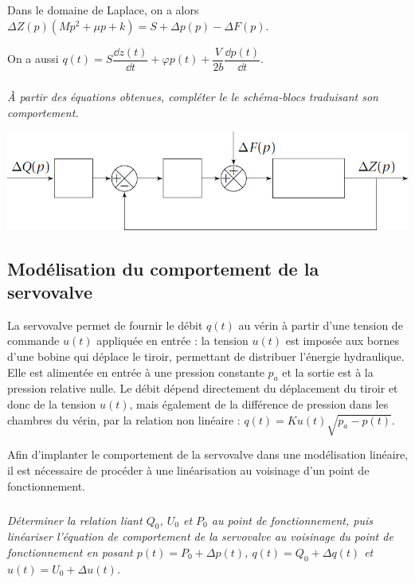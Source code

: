 \documentclass[10pt,fleqn]{article} %
\begin{document}
\begin{multicols}{2}
\begin{corrige}
Dans le domaine de Laplace, on a alors $ \Delta Z(p)  \left( Mp^2 + \mu p +k\right) = S+\Delta p(p) - \Delta F(p )
$.



On a aussi $q(t)=S \dfrac{\dd z (t)}{\dd t} +\varphi p(t) + \dfrac{V}{2b}  \dfrac{\dd p(t)}{\dd t}$. 
\end{corrige}
\else
\fi

\subparagraph{}\textit{À partir des équations obtenues, compléter le le schéma-blocs traduisant son
comportement.}
\ifprof
\begin{corrige}
\end{corrige}
\else
\fi

\begin{center}
\includegraphics[width=\linewidth]{images/fig_03}
\end{center}



\subsection*{Modélisation du comportement de la servovalve}
La servovalve permet de fournir le débit $q(t )$ au vérin à partir d’une tension de commande
$u(t )$ appliquée en entrée : la tension $u(t )$ est imposée aux bornes d’une bobine qui déplace le
tiroir, permettant de distribuer l’énergie hydraulique. Elle est alimentée en entrée à une pression
constante $p_a$ et la sortie est à la pression relative nulle.
Le débit dépend directement du déplacement du tiroir et donc de la tension $u(t )$, mais également
de la différence de pression dans les chambres du vérin, par la relation non linéaire :
$q(t ) = Ku(t) \sqrt{p_a-p(t)}$.
 
Afin d’implanter le comportement de la servovalve dans une modélisation linéaire, il est nécessaire
de procéder à une linéarisation au voisinage d’un point de fonctionnement.

\subparagraph{}\textit{Déterminer la relation liant $Q_0$, $U_0$ et $P_0$ au point de fonctionnement, puis linéariser l’équation de comportement de la servovalve au voisinage du point de fonctionnement en posant
$p(t ) = P_0 +\Delta p(t )$, $q(t ) =Q_0 +\Delta q(t )$ et $u(t ) =U_0 +\Delta u(t )$.}
\ifprof
\begin{corrige}
\end{corrige}
\else
\fi


\end{multicols}
\end{document}
